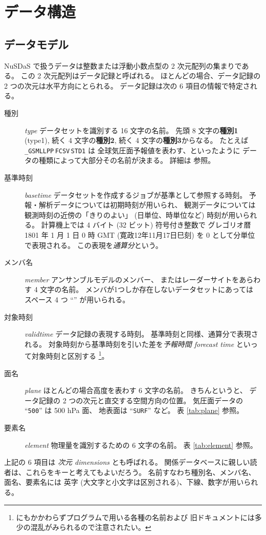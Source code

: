 \section{データ構造}

\subsection{データモデル}

NuSDaS で扱うデータは整数または浮動小数点型の 2 次元配列の集まりである。
この 2 次元配列はデータ記録と呼ばれる。
ほとんどの場合、データ記録の 2 つの次元は水平方向にとられる。
データ記録は次の 6 項目の情報で特定される。
%
\begin{description}
\item[種別] {\em type}
	データセットを識別する 16 文字の名前。
	先頭 8 文字の{\bf 種別1} (type1), 続く 4 文字の{\bf 種別2},
	続く 4 文字の{\bf 種別3}からなる。
	たとえば {\tt \_GSMLLPP}\,{\tt FCSV}\,{\tt STD1} は
	全球気圧面予報値を表わす、といったように
	データの種類によって大部分その名前が決まる。
	詳細は  参照。
\item[基準時刻] {\em basetime}
	データセットを作成するジョブが基準として参照する時刻。
	予報・解析データについては初期時刻が用いられ、
	観測データについては観測時刻の近傍の「きりのよい」
	(日単位、時単位など) 時刻が用いられる。
	計算機上では 4 バイト (32 ビット) 符号付き整数で
	グレゴリオ暦 1801 年 1 月 1 日 0 時 GMT
	(寛政12年11月17日巳刻) を 0 として分単位で表現される。
	この表現を{\em 通算分}という。
\item[メンバ名] {\em member}
	アンサンブルモデルのメンバー、
	またはレーダーサイトをあらわす 4 文字の名前。
	メンバが1つしか存在しないデータセットにあっては
	スペース 4 つ ``{\tt \SPC\SPC\SPC\SPC}'' が用いられる。
\item[対象時刻] {\em validtime}
	データ記録の表現する時刻。
	基準時刻と同様、通算分で表現される。
	対象時刻から基準時刻を引いた差を{\em 予報時間 forecast time}
	といって対象時刻と区別する%
	\footnote{にもかかわらずプログラムで用いる各種の名前および
	旧ドキュメントには多少の混乱がみられるので注意されたい。}。
\item[面名] {\em plane}
	ほとんどの場合高度を表わす 6 文字の名前。
	きちんというと、
	データ記録の 2 つの次元と直交する空間方向の位置。
	気圧面データの ``{\tt 500\SPC\SPC\SPC}'' は 500 hPa 面、
	地表面は ``{\tt SURF\SPC\SPC}'' など。
	表 \ref{tab:plane} 参照。
\item[要素名] {\em element}
	物理量を識別するための 6 文字の名前。
	表 \ref{tab:element} 参照。
\end{description}
%
上記の 6 項目は {\em 次元 dimensions} とも呼ばれる。
関係データベースに親しい読者は、これらをキーと考えてもよいだろう。
名前すなわち種別名、メンバ名、面名、要素名には
英字 (大文字と小文字は区別される)、下線、数字が用いられる。

